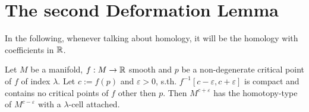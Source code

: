 \section{The second Deformation Lemma}

\begin{remark}
   In the following, whenever talking about homology, it will be the homology
   with coefficients in ${ \mathbb R }$.
\end{remark}

\begin{theorem}
   \label{theorem:2nd deformation lemma}
   Let $M$ be a manifold, $f: M \rightarrow { \mathbb R }$ smooth and $p$ be a 
   non-degenerate critical point of $f$ of index $\lambda$. Let $c := f(p)$ and 
   $\varepsilon > 0$, s.th. $f^{-1}[c-\varepsilon, c+\varepsilon]$ is compact 
   and contains no critical points of $f$ other then $p$. Then 
   $M^{c+\varepsilon}$ has the homotopy-type of  $M^{c-\varepsilon}$ with a 
   $\lambda$-cell attached.
\end{theorem}
 
